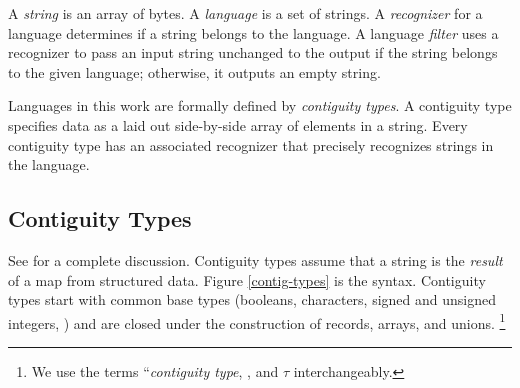 A \emph{string} is an array of bytes. A \emph{language} is a set of strings. A \emph{recognizer} for a language determines if a string belongs to the language.  A language \emph{filter} uses a recognizer to pass an input string unchanged to the output if the string belongs to the given language; otherwise, it outputs an empty string. 

Languages in this work are formally defined by \emph{contiguity types}. A contiguity type specifies data as a laid out side-by-side array of elements in a string. Every contiguity type has an associated recognizer that precisely recognizes strings in the language. 

\subsection{Contiguity Types}

See \cite{contiguity} for a complete discussion. Contiguity types assume that a string is the \emph{result} of a
map from structured data. Figure \ref{contig-types} is the syntax. Contiguity types start with common base types (booleans,
characters, signed and unsigned integers, \etc) and are closed under
the construction of records, arrays, and unions. \footnote{We use
the terms ``\emph{contiguity type}, , and $\tau$
interchangeably.}


